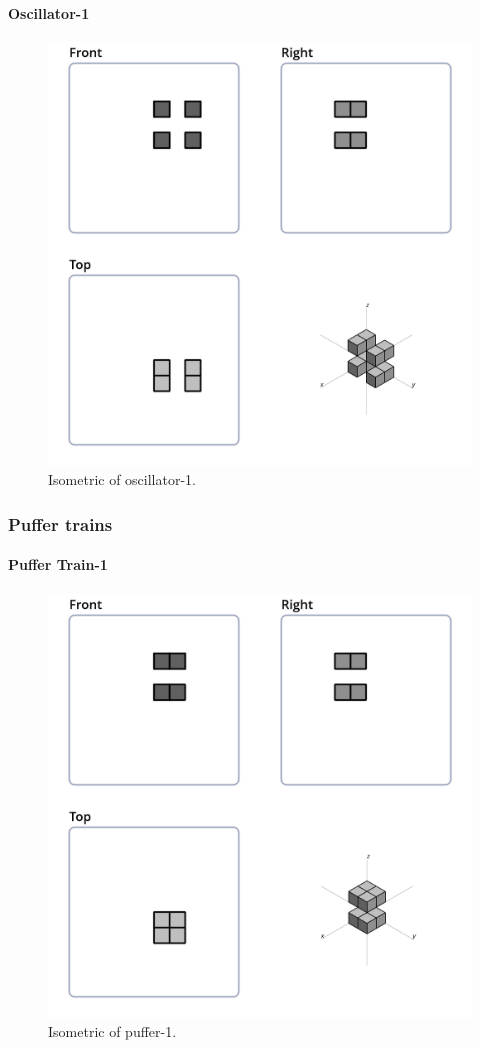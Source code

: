 \paragraph{Oscillator-1}
\begin{figure}
	\centering
	\includegraphics[scale=0.3]{iso_settings/osc_1.png}
	\caption{Isometric of oscillator-1.}
  \label{fig:iso-osc-1}
\end{figure}

\subsubsection{Puffer trains}
\paragraph{Puffer Train-1}
\begin{figure}
	\centering
	\includegraphics[scale=0.3]{iso_settings/puffer_1.png}
	\caption{Isometric of puffer-1.}
  \label{fig:iso-puffer-1}
\end{figure}
